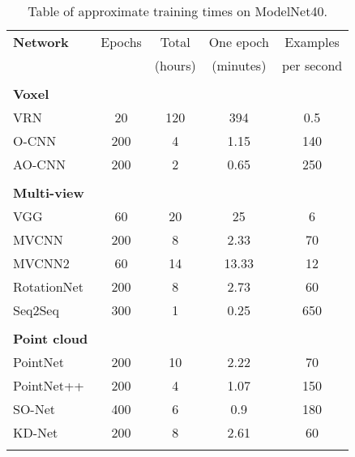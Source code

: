 \begin{table}[]
	\centering
	\begin{tabular}{lcccc}
		\hline
		\textbf{Network}       & Epochs &  Total  & One epoch &  Examples  \\ 
		                       &        & (hours) & (minutes) & per second \\\hline
		                       &        &         &           &            \\
		\textbf{Voxel }        &        &         &           &            \\
		VRN                    &   20   &   120   &    394    &    0.5     \\
		O-CNN                  &  200   &    4    &   1.15    &    140     \\
		AO-CNN                 &  200   &    2    &   0.65    &    250     \\
		                       &        &         &           &            \\
		\textbf{Multi-view }   &        &         &           &            \\
		VGG                    &   60   &   20    &    25     &     6      \\
		MVCNN                  &  200   &    8    &   2.33    &     70     \\
		MVCNN2                 &   60   &   14    &   13.33   &     12     \\
		RotationNet            &  200   &    8    &   2.73    &     60     \\
		Seq2Seq                &  300   &    1    &   0.25    &    650     \\
		                       &        &         &           &            \\
		\textbf{Point cloud  } &        &         &           &            \\
		PointNet               &  200   &   10    &   2.22    &     70     \\
		PointNet++             &  200   &    4    &   1.07    &    150     \\
		SO-Net                 &  400   &    6    &    0.9    &    180     \\
		KD-Net                 &  200   &    8    &   2.61    &     60     \\
		                       &        &         &           &            \\ \hline
	\end{tabular}
\caption{Table of approximate training times on ModelNet40.}
\label{Table:time}
\end{table}